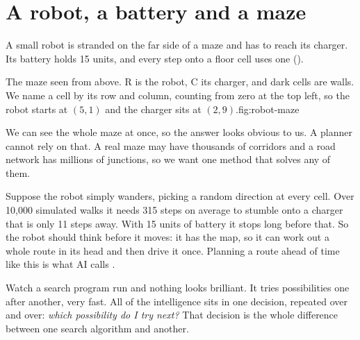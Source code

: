 \section{A robot, a battery and a maze}

A small robot is stranded on the far side of a maze and has to reach its charger. Its battery holds 15 units, and every step onto a floor cell uses one ().

\begin{utpfig}{The maze seen from above. R is the robot, C its charger, and dark cells are walls. We name a cell by its row and column, counting from zero at the top left, so the robot starts at $(5,1)$ and the charger sits at $(2,9)$.}{fig:robot-maze}
\end{utpfig}

We can see the whole maze at once, so the answer looks obvious to us. A planner cannot rely on that. A real maze may have thousands of corridors and a road network has millions of junctions, so we want one method that solves any of them.

Suppose the robot simply wanders, picking a random direction at every cell. Over 10,000 simulated walks it needs 315 steps on average to stumble onto a charger that is only 11 steps away. With 15 units of battery it stops long before that. So the robot should think before it moves: it has the map, so it can work out a whole route in its head and then drive it once. Planning a route ahead of time like this is what AI calls .

\begin{intuition}
Watch a search program run and nothing looks brilliant. It tries possibilities one after another, very fast. All of the intelligence sits in one decision, repeated over and over: \emph{which possibility do I try next?} That decision is the whole difference between one search algorithm and another.
\end{intuition}

